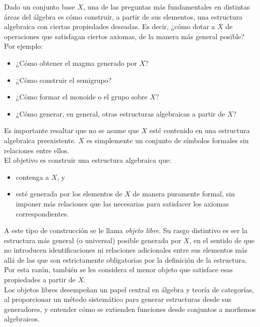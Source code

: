 \noindent Dado un conjunto base \(X\), una de las preguntas más fundamentales en distintas áreas del álgebra es cómo construir, a partir de sus elementos, una estructura algebraica con ciertas propiedades deseadas. Es decir, ¿cómo dotar a \(X\) de operaciones que satisfagan ciertos axiomas, de la manera más general posible? Por ejemplo:

\begin{itemize}
	\item ¿Cómo obtener el magma generado por \(X\)?
	\item ¿Cómo construir el semigrupo?
	\item ¿Cómo formar el monoide o el grupo sobre \(X\)?
	\item ¿Cómo generar, en general, otras estructuras algebraicas a partir de $X$?
\end{itemize}

\noindent Es importante resaltar que no se asume que \(X\) esté contenido en una estructura algebraica preexistente. \(X\) es simplemente un conjunto de símbolos formales sin relaciones entre ellos.\\

\noindent El objetivo es construir una estructura algebraica que:

\begin{itemize}
	\item contenga a \(X\), y
	\item esté generada por los elementos de \(X\) de manera puramente formal, sin imponer más relaciones que las necesarias para satisfacer los axiomas correspondientes.
\end{itemize}

\noindent A este tipo de construcción se le llama \emph{objeto libre}. Su rasgo distintivo es ser la estructura más general (o universal) posible generada por \(X\), en el sentido de que no introducen identificaciones ni relaciones adicionales entre sus elementos más allá de las que son estrictamente obligatorias por la definición de la estructura. Por esta razón, también se les considera el menor objeto que satisface esas propiedades a partir de \(X\).\\

\noindent Los objetos libres desempeñan un papel central en álgebra y teoría de categorías, al proporcionar un método sistemático para generar estructuras desde sus generadores, y entender cómo se extienden funciones desde conjuntos a morfismos algebraicos.






